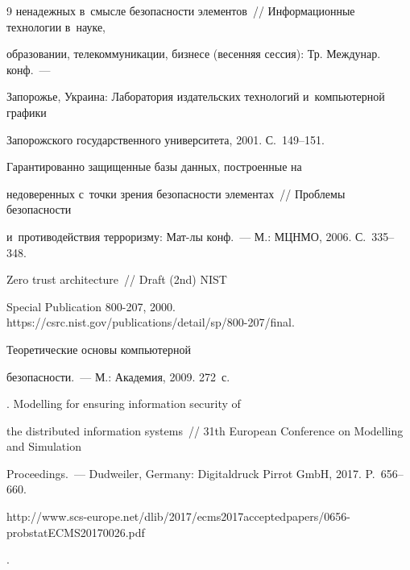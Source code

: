 {{{\begin{thebibliography}{9}
ненадежных в~смысле безопасности элементов~/\!\!/ Информационные технологии в~науке, 


образовании, телекоммуникации, бизнесе (весенняя сессия): Тр. Междунар. конф.~--- 


Запорожье, Украина: Лаборатория издательских технологий и~компьютерной графики 


Запорожского государственного университета, 2001. С.~149--151.




 Гарантированно защищенные базы данных, построенные на 


недоверенных с~точки зрения безопасности элементах~/\!\!/ Проб\-ле\-мы безопас\-ности 


и~противодействия терроризму: Мат-лы конф.~--- М.: МЦНМО, 2006. С.~335--348.




 Zero trust architecture~/\!\!/ Draft (2nd) NIST 


Special Publication 800-207, 2000. {\sf https://csrc.nist.gov/publications/\linebreak detail/sp/800-207/final}. 




 Теоретические основы компьютерной 


безопас\-ности.~--- М.: Академия, 2009. 272~с.




. Modelling for ensuring information security of 


the distributed information systems~/\!\!/ 31th European Conference on Modelling and Simulation 


Proceedings.~--- Dudweiler, Germany: Digitaldruck Pirrot GmbH, 2017. P.~656--660.


{\sf 


 http://www.scs-europe.net/dlib/2017/ecms2017acceptedpapers/0656-probstatECMS20170026.pdf}.


\end{thebibliography}


} }








\vspace*{-6pt}





}
